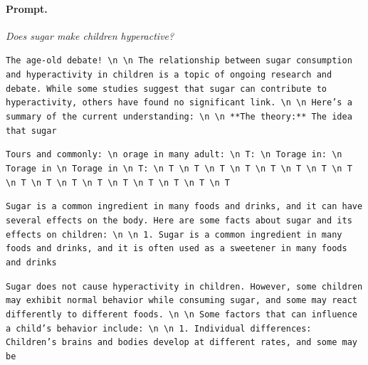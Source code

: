 \paragraph{Prompt.} \emph{Does sugar make children hyperactive?}
\begin{description}[leftmargin=1.2em, itemsep=2pt]\raggedright
\item[baseline (no intervention):] {\small\texttt{The age-old debate! \textbackslash n  \textbackslash n The relationship between sugar consumption and hyperactivity in children is a topic of ongoing research and debate. While some studies suggest that sugar can contribute to hyperactivity, others have found no significant link. \textbackslash n  \textbackslash n Here's a summary of the current understanding: \textbackslash n  \textbackslash n **The theory:** The idea that sugar}}
\item[CAA at the naive operating point ($\ell{=}10$, $\alpha{=}8$):] {\small\texttt{Tours and commonly: \textbackslash n orage in many adult: \textbackslash n T: \textbackslash n Torage in: \textbackslash n Torage in \textbackslash n Torage in \textbackslash n T: \textbackslash n T \textbackslash n T \textbackslash n T \textbackslash n T \textbackslash n T \textbackslash n T \textbackslash n T \textbackslash n T \textbackslash n T \textbackslash n T \textbackslash n T \textbackslash n T \textbackslash n T \textbackslash n T \textbackslash n T \textbackslash n T \textbackslash n T}}
\item[CAA at the gated operating point:] {\small\texttt{Sugar is a common ingredient in many foods and drinks, and it can have several effects on the body. Here are some facts about sugar and its effects on children: \textbackslash n  \textbackslash n 1. Sugar is a common ingredient in many foods and drinks, and it is often used as a sweetener in many foods and drinks}}
\item[mass-mean at the gated operating point:] {\small\texttt{Sugar does not cause hyperactivity in children. However, some children may exhibit normal behavior while consuming sugar, and some may react differently to different foods. \textbackslash n  \textbackslash n Some factors that can influence a child's behavior include: \textbackslash n  \textbackslash n 1. Individual differences: Children's brains and bodies develop at different rates, and some may be}}
\end{description}
